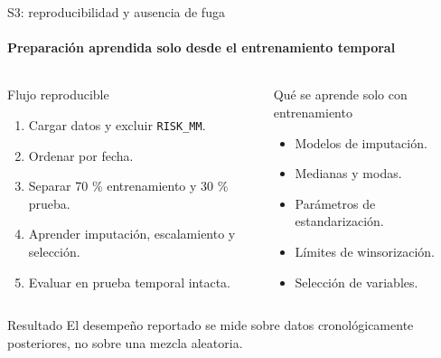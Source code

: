 \documentclass[aspectratio=169,10pt]{beamer}
\begin{document}
\begin{frame}{S3: reproducibilidad y ausencia de fuga}
\framesubtitle{Preparación aprendida solo desde el entrenamiento temporal}
\begin{columns}[T,onlytextwidth]
\begin{block}{Flujo reproducible}
\begin{enumerate}
\item Cargar datos y excluir \texttt{RISK\_MM}.
\item Ordenar por fecha.
\item Separar 70 \% entrenamiento y 30 \% prueba.
\item Aprender imputación, escalamiento y selección.
\item Evaluar en prueba temporal intacta.
\end{enumerate}
\end{block}
\begin{block}{Qué se aprende solo con entrenamiento}
\begin{itemize}
\item Modelos de imputación.
\item Medianas y modas.
\item Parámetros de estandarización.
\item Límites de winsorización.
\item Selección de variables.
\end{itemize}
\end{block}
\end{columns}
\begin{block}{Resultado}
El desempeño reportado se mide sobre datos cronológicamente posteriores, no sobre una mezcla aleatoria.
\end{block}
\end{frame}
\end{document}
